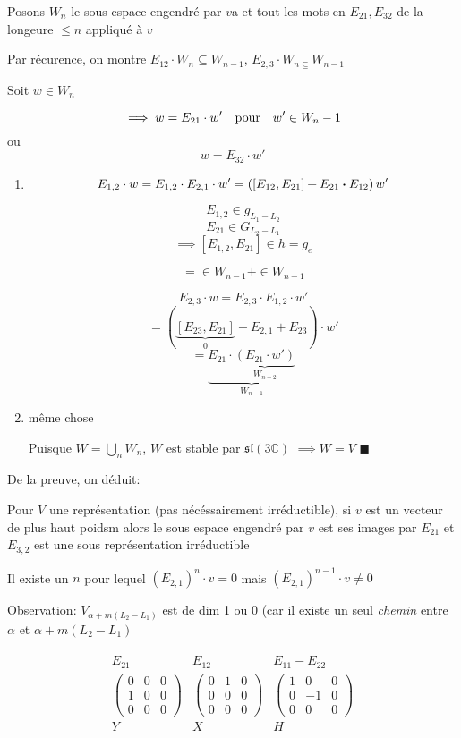 Posons \(W_n\) le sous-espace engendré par \(v\)a et tout les mots en \(E_{21}, E_{32}  \) de la longeure \(\leq n \) appliqué à \(v\)


Par récurence, on montre \(E_{12} \cdot W_n \subseteq W_{n-1} \), \(E_{2,3} \cdot W_{n\subseteq} W_{n-1} \)


Soit \(w\in W_n \)

\[ \implies w= E_{21}\cdot w' \qq{pour} w' \in W_n-1 \]
ou
\[ w = E_{32} \cdot w' \]

\begin{enumerate}
	\item \[ E_{1,2} \cdot w = E_{1,2}  \cdot E_{2,1} \cdot w' = \left( [E_{12}, E_{21}] + E_{21} \vdot E_{12}  \right) w'  \]
		\begin{tcolorbox}[title=]
			\[ E_{1,2} \in g_{L_1-L_2}  \]
			\[ E_{21} \in G_{L_2-L_1}  \]
			\[ \implies [E_{1,2}, E_{21} ] \in h = g_e   \] 
		\end{tcolorbox}
		\[ = \in W_{n-1} + \in W_{n-1}   \]


		\[ E_{2,3} \cdot w = E_{2,3} \cdot E_{1,2} \cdot w '  \]
		\[=\left( \underbrace{[E_{23}, E_{21} ]}_{0}  + E_{2,1} + E_{23}  \right) \cdot w' \]
		\[ =\underbrace{E_{21} \cdot \underbrace{\left( E_{21} \cdot w' \right)}_{W_{n-2} }}_{W_{n-1} }    \]
	\item même chose

Puisque \(W = \bigcup_n W_n \), \(W\) est stable par \(\mathfrak{sl}(3 \mathds{C})\) \(\implies W = V \) \(\blacksquare\)
\end{enumerate}


De la preuve, on déduit: 

Pour \(V\) une représentation (pas nécéssairement irréductible), si \(v\) est un vecteur de plus haut poidsm alors le sous espace engendré par \(v\) est ses images par \(E_{21} \) et \(E_{3,2} \) est une sous représentation irréductible


Il existe un \(n\) pour lequel \(\left( E_{2,1}  \right) ^n \cdot v = 0\) mais \(\left( E_{2,1}  \right) ^{n-1} \cdot v \neq 0\)

Observation: \(V_{\alpha+m(L_2-L_1)} \) est de dim 1 ou 0 (car il existe un seul \textit{chemin} entre \(\alpha \) et \(\alpha + m(L_2 - L_1 )\)

\begin{align*}
	\begin{matrix}
		E_{21} & E_{12} & E_{11} - E_{22} \\
		\begin{pmatrix} 0 & 0 & 0 \\ 1 & 0 &0 \\ 0&0&0 \end{pmatrix} & \begin{pmatrix} 0 & 1&0\\0&0&0\\0&0&0 \end{pmatrix} & \begin{pmatrix} 1 &0 &0\\ 0 &-1&0\\0&0&0 \end{pmatrix} \\
	Y & X & H
	\end{matrix}
\end{align*}

